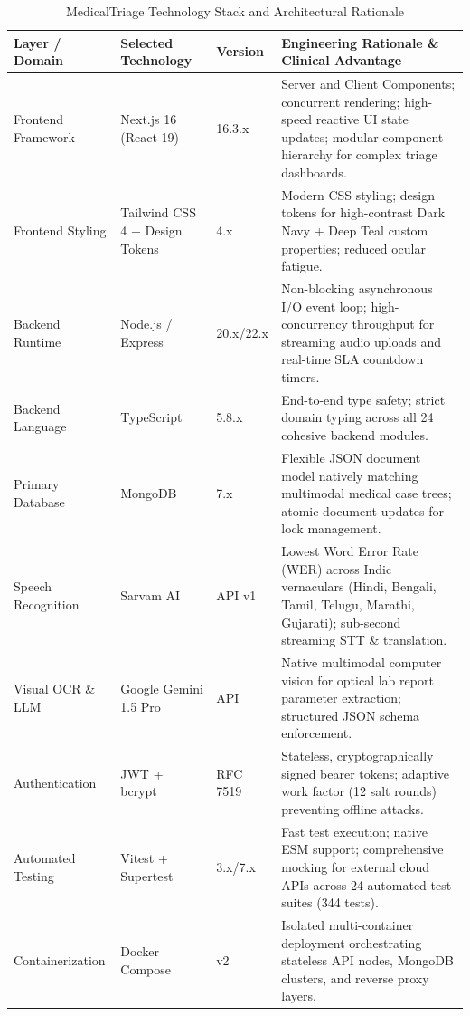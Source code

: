 \documentclass[11pt,a4paper,oneside]{report}
\begin{document}
\begin{table}[htbp]
  \centering
  \small
  \caption{MedicalTriage Technology Stack and Architectural Rationale}
  \label{tab:tech_stack}
  \begin{tabularx}{\textwidth}{p{2.6cm}p{3.0cm}p{1.4cm}X}
    \toprule
    \textbf{Layer / Domain} & \textbf{Selected Technology} & \textbf{Version} & \textbf{Engineering Rationale \& Clinical Advantage} \\
    \midrule
    Frontend Framework & Next.js 16 (React 19) & 16.3.x & Server and Client Components; concurrent rendering; high-speed reactive UI state updates; modular component hierarchy for complex triage dashboards. \\
    \addlinespace
    Frontend Styling & Tailwind CSS 4 + Design Tokens & 4.x & Modern CSS styling; design tokens for high-contrast Dark Navy + Deep Teal custom properties; reduced ocular fatigue. \\
    \addlinespace
    Backend Runtime & Node.js / Express & 20.x/22.x & Non-blocking asynchronous I/O event loop; high-concurrency throughput for streaming audio uploads and real-time SLA countdown timers. \\
    \addlinespace
    Backend Language & TypeScript & 5.8.x & End-to-end type safety; strict domain typing across all 24 cohesive backend modules. \\
    \addlinespace
    Primary Database & MongoDB & 7.x & Flexible JSON document model natively matching multimodal medical case trees; atomic document updates for lock management. \\
    \addlinespace
    Speech Recognition & Sarvam AI & API v1 & Lowest Word Error Rate (WER) across Indic vernaculars (Hindi, Bengali, Tamil, Telugu, Marathi, Gujarati); sub-second streaming STT \& translation. \\
    \addlinespace
    Visual OCR \& LLM & Google Gemini 1.5 Pro & API & Native multimodal computer vision for optical lab report parameter extraction; structured JSON schema enforcement. \\
    \addlinespace
    Authentication & JWT + bcrypt & RFC 7519 & Stateless, cryptographically signed bearer tokens; adaptive work factor (12 salt rounds) preventing offline attacks. \\
    \addlinespace
    Automated Testing & Vitest + Supertest & 3.x/7.x & Fast test execution; native ESM support; comprehensive mocking for external cloud APIs across 24 automated test suites (344 tests). \\
    \addlinespace
    Containerization & Docker Compose & v2 & Isolated multi-container deployment orchestrating stateless API nodes, MongoDB clusters, and reverse proxy layers. \\
    \bottomrule
  \end{tabularx}
\end{table}
\end{document}
